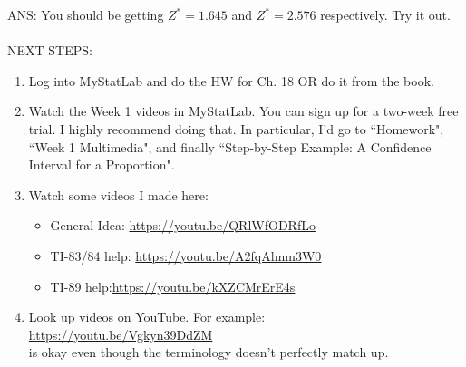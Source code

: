 \documentclass[12pt]{amsart}
\theoremstyle{definition}
\begin{document}
ANS: You should be getting $Z^*=1.645$ and $Z^*=2.576$ respectively. Try it out.\\
~\\
NEXT STEPS:
\begin{enumerate}
\item Log into MyStatLab and do the HW for Ch. 18 OR do it from the book.
\item Watch the Week 1 videos in MyStatLab. You can sign up for a two-week free trial. I highly recommend doing that. In particular, I'd go to ``Homework", ``Week 1 Multimedia", and finally ``Step-by-Step Example: A Confidence Interval for a Proportion".
\item Watch some videos I made here:
\begin{itemize}
\item General Idea: \url{https://youtu.be/QRlWfODRfLo}
\item TI-83/84 help: \url{https://youtu.be/A2fqAlmm3W0}
\item TI-89 help:\url{https://youtu.be/kXZCMrErE4s}
\end{itemize}
\item Look up videos on YouTube. For example:\\
\url{https://youtu.be/Vgkyn39DdZM}\\
is okay even though the terminology doesn't perfectly match up.
\end{enumerate}
\end{document}
